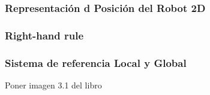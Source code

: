 \begin{frame}
    \frametitle{Representación d Posición del Robot 2D}

\end{frame}


\begin{frame}
    \frametitle{Right-hand rule}

\end{frame}

\begin{frame}
    \frametitle{Sistema de referencia Local y Global}
    Poner imagen 3.1 del libro
\end{frame}